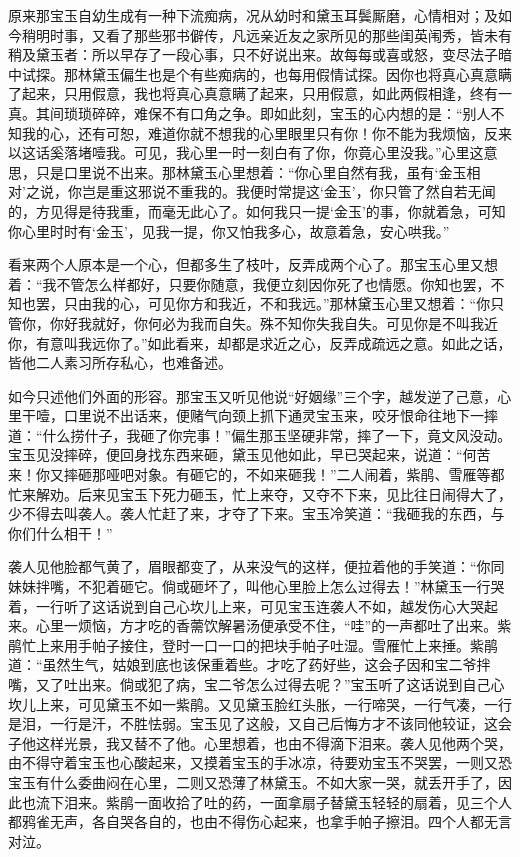 \documentclass[12pt,oneside]{book}
\begin{document}
原来那宝玉自幼生成有一种下流痴病，况从幼时和黛玉耳鬓厮磨，心情相对；及如今稍明时事，又看了那些邪书僻传，凡远亲近友之家所见的那些闺英闱秀，皆未有稍及黛玉者：所以早存了一段心事，只不好说出来。故每每或喜或怒，变尽法子暗中试探。那林黛玉偏生也是个有些痴病的，也每用假情试探。因你也将真心真意瞒了起来，只用假意，我也将真心真意瞒了起来，只用假意，如此两假相逢，终有一真。其间琐琐碎碎，难保不有口角之争。即如此刻，宝玉的心内想的是：“别人不知我的心，还有可恕，难道你就不想我的心里眼里只有你！你不能为我烦恼，反来以这话奚落堵噎我。可见，我心里一时一刻白有了你，你竟心里没我。”心里这意思，只是口里说不出来。那林黛玉心里想着：“你心里自然有我，虽有‘金玉相对’之说，你岂是重这邪说不重我的。我便时常提这‘金玉’，你只管了然自若无闻的，方见得是待我重，而毫无此心了。如何我只一提‘金玉’的事，你就着急，可知你心里时时有‘金玉’，见我一提，你又怕我多心，故意着急，安心哄我。”

看来两个人原本是一个心，但都多生了枝叶，反弄成两个心了。那宝玉心里又想着：“我不管怎么样都好，只要你随意，我便立刻因你死了也情愿。你知也罢，不知也罢，只由我的心，可见你方和我近，不和我远。”那林黛玉心里又想着：“你只管你，你好我就好，你何必为我而自失。殊不知你失我自失。可见你是不叫我近你，有意叫我远你了。”如此看来，却都是求近之心，反弄成疏远之意。如此之话，皆他二人素习所存私心，也难备述。

如今只述他们外面的形容。那宝玉又听见他说“好姻缘”三个字，越发逆了己意，心里干噎，口里说不出话来，便赌气向颈上抓下通灵宝玉来，咬牙恨命往地下一摔道：“什么捞什子，我砸了你完事！”偏生那玉坚硬非常，摔了一下，竟文风没动。宝玉见没摔碎，便回身找东西来砸，黛玉见他如此，早已哭起来，说道：“何苦来！你又摔砸那哑吧对象。有砸它的，不如来砸我！”二人闹着，紫鹃、雪雁等都忙来解劝。后来见宝玉下死力砸玉，忙上来夺，又夺不下来，见比往日闹得大了，少不得去叫袭人。袭人忙赶了来，才夺了下来。宝玉冷笑道：“我砸我的东西，与你们什么相干！”

袭人见他脸都气黄了，眉眼都变了，从来没气的这样，便拉着他的手笑道：“你同妹妹拌嘴，不犯着砸它。倘或砸坏了，叫他心里脸上怎么过得去！”林黛玉一行哭着，一行听了这话说到自己心坎儿上来，可见宝玉连袭人不如，越发伤心大哭起来。心里一烦恼，方才吃的香薷饮解暑汤便承受不住，“哇”的一声都吐了出来。紫鹃忙上来用手帕子接住，登时一口一口的把块手帕子吐湿。雪雁忙上来捶。紫鹃道：“虽然生气，姑娘到底也该保重着些。才吃了药好些，这会子因和宝二爷拌嘴，又了吐出来。倘或犯了病，宝二爷怎么过得去呢？”宝玉听了这话说到自己心坎儿上来，可见黛玉不如一紫鹃。又见黛玉脸红头胀，一行啼哭，一行气凑，一行是泪，一行是汗，不胜怯弱。宝玉见了这般，又自己后悔方才不该同他较证，这会子他这样光景，我又替不了他。心里想着，也由不得滴下泪来。袭人见他两个哭，由不得守着宝玉也心酸起来，又摸着宝玉的手冰凉，待要劝宝玉不哭罢，一则又恐宝玉有什么委曲闷在心里，二则又恐薄了林黛玉。不如大家一哭，就丢开手了，因此也流下泪来。紫鹃一面收拾了吐的药，一面拿扇子替黛玉轻轻的扇着，见三个人都鸦雀无声，各自哭各自的，也由不得伤心起来，也拿手帕子擦泪。四个人都无言对泣。
\end{document}
